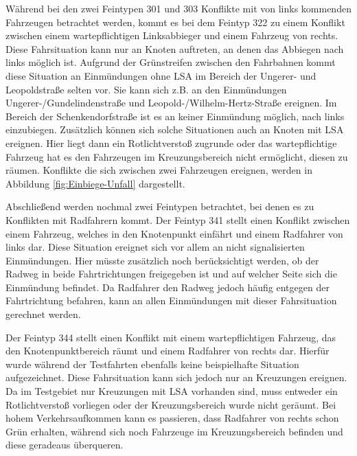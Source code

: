 Während bei den zwei Feintypen 301 und 303 Konflikte mit von links kommenden Fahrzeugen betrachtet werden, kommt es bei dem Feintyp 322 zu einem Konflikt zwischen einem wartepflichtigen Linksabbieger und einem Fahrzeug von rechts. Diese Fahrsituation kann nur an Knoten auftreten, an denen das Abbiegen nach links möglich ist. Aufgrund der Grünstreifen zwischen den Fahrbahnen kommt diese Situation an Einmündungen ohne LSA im Bereich der Ungerer- und Leopoldstraße selten vor. Sie kann sich z.B. an den Einmündungen Ungerer-/Gundelindenstraße und Leopold-/Wilhelm-Hertz-Straße ereignen. Im Bereich der Schenkendorfstraße ist es an keiner Einmündung möglich, nach links einzubiegen. Zusätzlich können sich solche Situationen auch an Knoten mit \ac{LSA} ereignen. Hier liegt dann ein Rotlichtverstoß zugrunde oder das wartepflichtige Fahrzeug hat es den Fahrzeugen im Kreuzungsbereich nicht ermöglicht, diesen zu räumen. Konflikte die sich zwischen zwei Fahrzeugen ereignen, werden in Abbildung \ref{fig:Einbiege-Unfall} dargestellt.

Abschließend werden nochmal zwei Feintypen betrachtet, bei denen es zu Konflikten mit Radfahrern kommt. Der Feintyp 341 stellt einen Konflikt zwischen einem Fahrzeug, welches in den Knotenpunkt einfährt und einem Radfahrer von links dar. Diese Situation ereignet sich vor allem an nicht signalisierten Einmündungen. Hier müsste zusätzlich noch berücksichtigt werden, ob der Radweg in beide Fahrtrichtungen freigegeben ist und auf welcher Seite sich die Einmündung befindet. Da Radfahrer den Radweg jedoch häufig entgegen der Fahrtrichtung befahren, kann an allen Einmündungen mit dieser Fahrsituation gerechnet werden.

Der Feintyp 344 stellt einen Konflikt mit einem wartepflichtigen Fahrzeug, das den Knotenpunktbereich räumt und einem Radfahrer von rechts dar. Hierfür wurde während der Testfahrten ebenfalls keine beispielhafte Situation aufgezeichnet. Diese Fahrsituation kann sich jedoch nur an Kreuzungen ereignen. Da im Testgebiet nur Kreuzungen mit LSA vorhanden sind, muss entweder ein Rotlichtverstoß vorliegen oder der Kreuzungsbereich wurde nicht geräumt. Bei hohem Verkehrsaufkommen kann es passieren, dass Radfahrer von rechts schon Grün erhalten, während sich noch Fahrzeuge im Kreuzungsbereich befinden und diese geradeaus überqueren.

